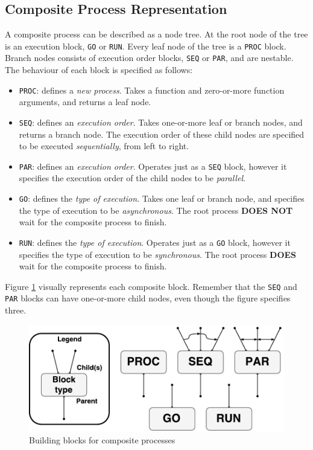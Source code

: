 \subsection{Composite Process Representation}

A composite process can be described as a node tree. At the root node of the tree is an execution block, \texttt{GO} or \texttt{RUN}. Every leaf node of the tree is a \texttt{PROC} block. Branch nodes consists of execution order blocks, \texttt{SEQ} or \texttt{PAR}, and are nestable. The behaviour of each block is specified as follows:
\begin{itemize}[topsep=0em,itemsep=-1em,partopsep=-1em,parsep=1em]
    \item \texttt{PROC}: defines a \textit{new process}. Takes a function and zero\hyp{}or\hyp{}more function arguments, and returns a leaf node. 
    
    \item \texttt{SEQ}: defines an \textit{execution order}. Takes one\hyp{}or\hyp{}more leaf or branch nodes, and returns a branch node. The execution order of these child nodes are specified to be executed \textit{sequentially}, from left to right. 
    
    \item \texttt{PAR}: defines an \textit{execution order}. Operates just as a \texttt{SEQ} block, however it specifies the execution order of the child nodes to be \textit{parallel}. 
    
    \item \texttt{GO}: defines the \textit{type of execution}. Takes one leaf or branch node, and specifies the type of execution to be \textit{asynchronous}. The root process \textbf{DOES NOT} wait for the composite process to finish.
    
    \item \texttt{RUN}: defines the \textit{type of execution}. Operates just as a \texttt{GO} block, however it specifies the type of execution to be \textit{synchronous}. The root process \textbf{DOES} wait for the composite process to finish.
\end{itemize}

Figure \ref{fig:composite_blocks} visually represents each composite block. Remember that the \texttt{SEQ} and \texttt{PAR} blocks can have one\hyp{}or\hyp{}more child nodes, even though the figure specifies three. 

\FloatBarrier

\begin{figure}[h]
    \centering
    \includegraphics[width=0.8\linewidth]{fig/csp}
    \caption{Building blocks for composite processes}
    \label{fig:composite_blocks}
\end{figure}

